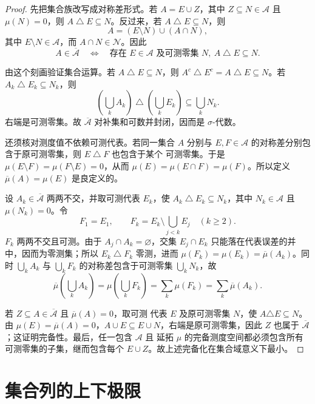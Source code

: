 \begin{proof}
先把集合族改写成对称差形式。若 $A=E\cup Z$，其中
$Z\subseteq N\in\mathcal A$ 且 $\mu(N)=0$，则
$A\mathbin\triangle E\subseteq N$。反过来，若
$A\mathbin\triangle E\subseteq N$，则
\[
 A=(E\setminus N)\cup(A\cap N),
\]
其中 $E\setminus N\in\mathcal A$，而 $A\cap N\in\mathcal N$。因此
\begin{equation}
 A\in\overline{\mathcal A}
 \quad\Longleftrightarrow\quad
 \text{存在 }E\in\mathcal A\text{ 及可测零集 }N,
 \ A\mathbin\triangle E\subseteq N.
 \label{eq:completion-symmetric-difference}
\end{equation}

由这个刻画验证集合运算。若
$A\mathbin\triangle E\subseteq N$，则
$A^c\mathbin\triangle E^c=A\mathbin\triangle E\subseteq N$。若
$A_k\mathbin\triangle E_k\subseteq N_k$，则
\[
 \left(\bigcup_kA_k\right)\mathbin\triangle
 \left(\bigcup_kE_k\right)
 \subseteq\bigcup_kN_k.
\]
右端是可测零集。故 $\overline{\mathcal A}$ 对补集和可数并封闭，因而是
$\sigma$-代数。

还须核对测度值不依赖可测代表。若同一集合 $A$ 分别与
$E,F\in\mathcal A$ 的对称差分别包含于原可测零集，则 $E\mathbin\triangle F$ 也包含于某个
可测零集。于是
$\mu(E\setminus F)=\mu(F\setminus E)=0$，从而
$\mu(E)=\mu(E\cap F)=\mu(F)$。所以定义
$\overline\mu(A)=\mu(E)$ 是良定义的。

设 $A_k\in\overline{\mathcal A}$ 两两不交，并取可测代表 $E_k$，使
$A_k\mathbin\triangle E_k\subseteq N_k$，其中 $N_k\in\mathcal A$ 且
$\mu(N_k)=0$。令
\[
 F_1=E_1,\qquad
 F_k=E_k\setminus\bigcup_{j<k}E_j\quad(k\ge2).
\]
$F_k$ 两两不交且可测。由于 $A_j\cap A_k=\varnothing$，交集
$E_j\cap E_k$ 只能落在代表误差的并中，因而为零测集；所以
$E_k\mathbin\triangle F_k$ 零测，进而
$\mu(F_k)=\mu(E_k)=\overline\mu(A_k)$。同时
$\bigcup_kA_k$ 与 $\bigcup_kF_k$ 的对称差包含于可测零集
$\bigcup_kN_k$，故
\[
 \overline\mu\left(\bigcup_kA_k\right)
 =\mu\left(\bigcup_kF_k\right)
 =\sum_k\mu(F_k)
 =\sum_k\overline\mu(A_k).
\]

若 $Z\subseteq A\in\overline{\mathcal A}$ 且 $\overline\mu(A)=0$，取可测
代表 $E$ 及原可测零集 $N$，使 $A\triangle E\subseteq N$。
由 $\mu(E)=\overline\mu(A)=0$，$A\cup E\subseteq E\cup N$，右端是原可测零集，因此 $Z$ 也属于
$\overline{\mathcal A}$；这证明完备性。最后，任一包含 $\mathcal A$ 且
延拓 $\mu$ 的完备测度空间都必须包含所有可测零集的子集，继而包含每个
$E\cup Z$。故上述完备化在集合域意义下最小。
\end{proof}

\section{集合列的上下极限}

